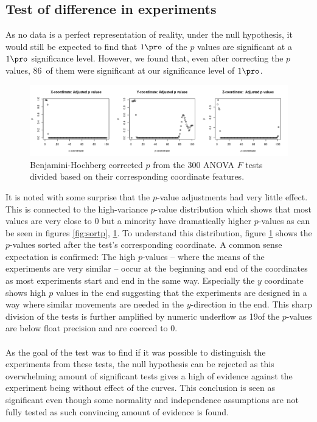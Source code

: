 \documentclass[11pt,fleqn]{article}
\begin{document}
\subsection{Test of difference in experiments}
As no data is a perfect representation of reality, under the null hypothesis, it would still be expected to find that $ 1\pro $ of the $ p $ values are significant at a $ 1\pro $ significance level. However, we found that, even after correcting the $ p $ values, 86\pro\ of them were significant at our significance level of $ 1\pro $.
\begin{figure}[H]
	\centering
	\includegraphics[width=.9\textwidth]{coordinate_ps}
	\caption{Benjamini-Hochberg corrected $ p $ from the 300 ANOVA \(F\) tests divided based on their corresponding coordinate features.}\label{fig:unsortp}
\end{figure}\noindent 
It is noted with some surprise that the \(p\)-value adjustments had very little effect. This is connected to the high-variance \(p\)-value distribution which shows that most values are very close to 0 but a minority have dramatically higher \(p\)-values as can be seen in figures \ref{fig:sortp}, \ref{fig:unsortp}. To understand this distribution, figure \ref{fig:unsortp} shows the \(p\)-values sorted after the test's corresponding coordinate.  
A common sense expectation is confirmed: The high \(p\)-values -- where the means of the experiments are very similar -- occur at the beginning and end of the coordinates as most experiments start and end in the same way. 
Especially the \(y\) coordinate shows high \(p\) values in the end suggesting that the experiments are designed in a way where similar movements are needed in the \(y\)-direction in the end. 
This sharp division of the tests is further amplified by numeric underflow as 19\pro of the \(p\)-values are below float precision and are coerced to 0.
\\\\
As the goal of the test was to find if it was possible to distinguish the experiments from these tests, the null hypothesis can be rejected as this overwhelming amount of significant tests gives a high of evidence against the experiment being without effect of the curves.
This conclusion is seen as significant even though some normality and independence assumptions are not fully tested as such convincing amount of evidence is found.
 
\end{document}
